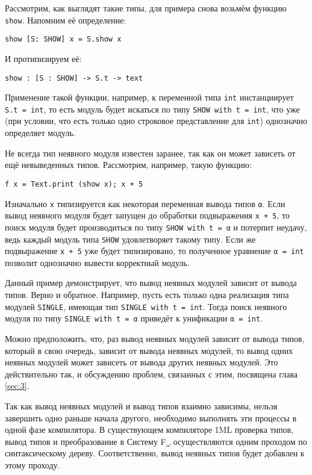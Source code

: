 \documentclass[../diploma.tex]{subfiles}
\begin{document}
Рассмотрим, как выглядят такие типы, для примера снова возьмём функцию \texttt{show}. Напомним её определение:

\begin{verbatim}
show [S: SHOW] x = S.show x
\end{verbatim}

И протипизируем её:

\begin{verbatim}
show : [S : SHOW] -> S.t -> text
\end{verbatim}

Применение такой функции, например, к переменной типа \texttt{int} инстанциирует \\\texttt{S.t = int}, то есть модуль будет искаться по типу \texttt{SHOW with t = int}, что уже (при условии, что есть только одно строковое представление для \texttt{int}) однозначно определяет модуль.

Не всегда тип неявного модуля известен заранее, так как он может зависеть от ещё невыведенных типов. Рассмотрим, например, такую функцию:

\begin{verbatim}
f x = Text.print (show x); x + 5
\end{verbatim}

Изначально \texttt{x} типизируется как некоторая переменная вывода типов \texttt{α}. Если вывод неявного модуля будет запущен до обработки подвыражения \texttt{x + 5}, то поиск модуля будет производиться по типу \texttt{SHOW with t = α} и потерпит неудачу, ведь каждый модуль типа \texttt{SHOW} удовлетворяет такому типу. Если же подвыражение \texttt{x + 5} уже будет типизировано, то полученное уравнение \texttt{α = int} позволит однозначно вывести корректный модуль.

Данный пример демонстрирует, что вывод неявных модулей зависит от вывода типов. Верно и обратное. Например, пусть есть только одна реализация типа модулей \texttt{SINGLE}, имеющая тип \texttt{SINGLE with t = int}. Тогда поиск неявного модуля по типу \texttt{SINGLE with t = α} приведёт к унификации \texttt{α = int}.

Можно предположить, что, раз вывод неявных модулей зависит от вывода типов, который в свою очередь, зависит от вывода неявных модулей, то вывод одних неявных модулей может зависеть от вывода других неявных модулей. Это действительно так, и обсуждению проблем, связанных с этим, посвящена глава \ref{sec:3}.

Так как вывод неявных модулей и вывод типов взаимно зависимы, нельзя завершить одно раньше начала другого, необходимо выполнять эти процессы в одной фазе компилятора. В существующем компиляторе 1ML проверка типов, вывод типов и преобразование в Систему F\textsubscript{$\omega$} осуществляются одним проходом по синтаксическому дереву. Соответственно, вывод неявных типов будет добавлен к этому проходу.
\end{document}
